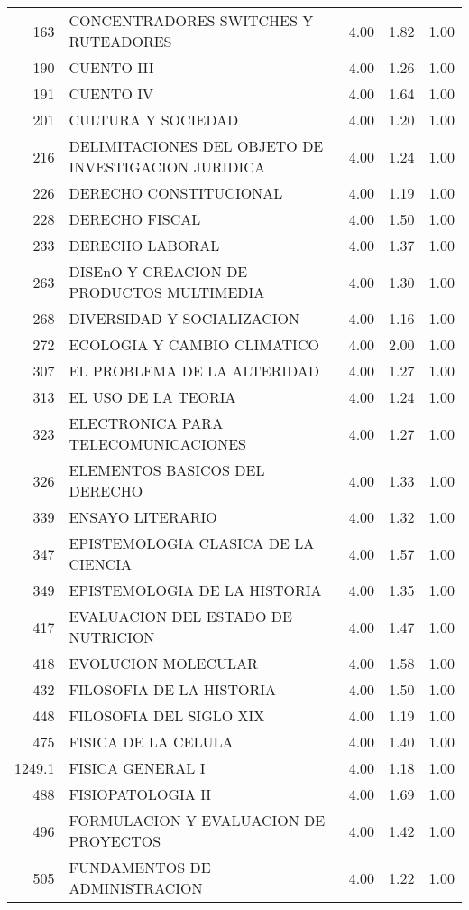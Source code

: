 \documentclass[12pt]{article}
\begin{document}
\begin{table}[ht]
\begin{tabular}{rlrrr}
  163 & CONCENTRADORES SWITCHES Y RUTEADORES & 4.00 & 1.82 & 1.00 \\ 
  190 & CUENTO III & 4.00 & 1.26 & 1.00 \\ 
  191 & CUENTO IV & 4.00 & 1.64 & 1.00 \\ 
  201 & CULTURA Y SOCIEDAD & 4.00 & 1.20 & 1.00 \\ 
  216 & DELIMITACIONES DEL OBJETO DE INVESTIGACION JURIDICA & 4.00 & 1.24 & 1.00 \\ 
  226 & DERECHO CONSTITUCIONAL & 4.00 & 1.19 & 1.00 \\ 
  228 & DERECHO FISCAL & 4.00 & 1.50 & 1.00 \\ 
  233 & DERECHO LABORAL & 4.00 & 1.37 & 1.00 \\ 
  263 & DISEnO Y CREACION DE PRODUCTOS MULTIMEDIA & 4.00 & 1.30 & 1.00 \\ 
  268 & DIVERSIDAD Y SOCIALIZACION & 4.00 & 1.16 & 1.00 \\ 
  272 & ECOLOGIA Y CAMBIO CLIMATICO & 4.00 & 2.00 & 1.00 \\ 
  307 & EL PROBLEMA DE LA ALTERIDAD & 4.00 & 1.27 & 1.00 \\ 
  313 & EL USO DE LA TEORIA & 4.00 & 1.24 & 1.00 \\ 
  323 & ELECTRONICA PARA TELECOMUNICACIONES & 4.00 & 1.27 & 1.00 \\ 
  326 & ELEMENTOS BASICOS DEL DERECHO & 4.00 & 1.33 & 1.00 \\ 
  339 & ENSAYO LITERARIO & 4.00 & 1.32 & 1.00 \\ 
  347 & EPISTEMOLOGIA CLASICA DE LA CIENCIA & 4.00 & 1.57 & 1.00 \\ 
  349 & EPISTEMOLOGIA DE LA HISTORIA & 4.00 & 1.35 & 1.00 \\ 
  417 & EVALUACION DEL ESTADO DE NUTRICION & 4.00 & 1.47 & 1.00 \\ 
  418 & EVOLUCION MOLECULAR & 4.00 & 1.58 & 1.00 \\ 
  432 & FILOSOFIA DE LA HISTORIA & 4.00 & 1.50 & 1.00 \\ 
  448 & FILOSOFIA DEL SIGLO XIX & 4.00 & 1.19 & 1.00 \\ 
  475 & FISICA DE LA CELULA & 4.00 & 1.40 & 1.00 \\ 
  1249.1 & FISICA GENERAL I & 4.00 & 1.18 & 1.00 \\ 
  488 & FISIOPATOLOGIA II & 4.00 & 1.69 & 1.00 \\ 
  496 & FORMULACION Y EVALUACION DE PROYECTOS & 4.00 & 1.42 & 1.00 \\ 
  505 & FUNDAMENTOS DE ADMINISTRACION & 4.00 & 1.22 & 1.00 \\ 

\end{tabular}
\end{table}
\end{document}
